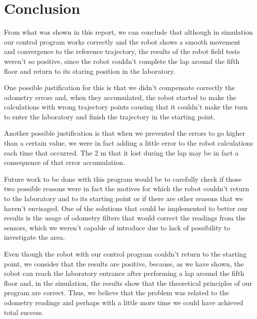\documentclass[11pt,a4paper]{scrartcl}
\begin{document}
\section{Conclusion}
From what was shown in this report, we can conclude that although in simulation our control program works correctly and the robot shows a smooth movement and convergence to the reference trajectory, the results of the robot field tests weren't so positive, since the robot couldn't complete the lap around the fifth floor and return to its staring position in the laboratory.

One possible justification for this is that we didn't compensate correctly the odometry errors and, when they accumulated, the robot started to make the calculations with wrong trajectory points causing that it couldn't make the turn to enter the laboratory and finish the trajectory in the starting point.

Another possible justification is that when we prevented the errors to go higher than a certain value, we were in fact adding a little error to the robot calculations each time that occurred. The 2 m that it lost during the lap may be in fact a consequence of that error accumulation.

Future work to be done with this program would be to carefully check if those two possible reasons were in fact the motives for which the robot couldn't return to the laboratory and to its starting point or if there are other reasons that we haven't envisaged. One of the solutions that could be implemented to better our results is the usage of odometry filters that would correct the readings from the sensors, which we weren't capable of introduce due to lack of possibility to investigate the area.

Even though the robot with our control program couldn't return to the starting point, we consider that the results are positive, because, as we have shown, the robot can reach the laboratory entrance after performing a lap around the fifth floor and, in the simulation, the results show that the theoretical principles of our program are correct. Thus, we believe that the problem was related to the odometry readings and perhaps with a little more time we could have achieved total success.
\end{document}
